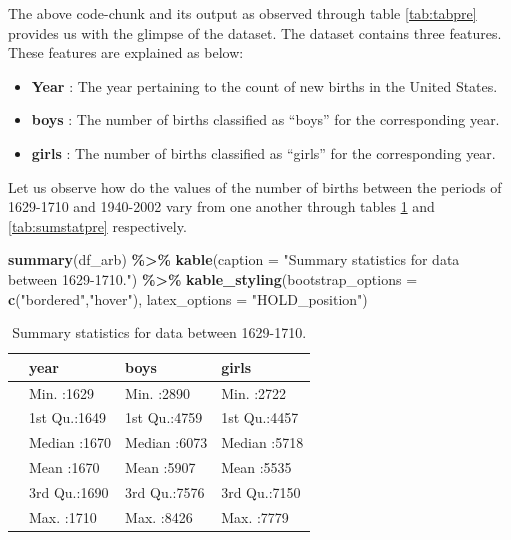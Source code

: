 \documentclass[11pt,a4paper,]{article}
\newenvironment{Shaded}{\begin{snugshade}}{\end{snugshade}}
\newcommand{\AttributeTok}[1]{\textcolor[rgb]{0.13,0.29,0.53}{#1}}
\newcommand{\FunctionTok}[1]{\textcolor[rgb]{0.13,0.29,0.53}{\textbf{#1}}}
\newcommand{\NormalTok}[1]{#1}
\newcommand{\SpecialCharTok}[1]{\textcolor[rgb]{0.81,0.36,0.00}{\textbf{#1}}}
\newcommand{\StringTok}[1]{\textcolor[rgb]{0.31,0.60,0.02}{#1}}
\providecommand{\tightlist}{%
  \setlength{\itemsep}{0pt}\setlength{\parskip}{0pt}}
\begin{document}
The above code-chunk and its output as observed through table \ref{tab:tabpre} provides us with the glimpse of the dataset. The dataset contains three features. These features are explained as below:

\begin{itemize}
\tightlist
\item
  \textbf{Year} : The year pertaining to the count of new births in the United States.
\item
  \textbf{boys} : The number of births classified as ``boys'' for the corresponding year.
\item
  \textbf{girls} : The number of births classified as ``girls'' for the corresponding year.
\end{itemize}

Let us observe how do the values of the number of births between the periods of 1629-1710 and 1940-2002 vary from one another through tables \ref{tab:sumstatarb} and \ref{tab:sumstatpre} respectively.

\scriptsize

\begin{Shaded}
\begin{Highlighting}[]
\FunctionTok{summary}\NormalTok{(df\_arb) }\SpecialCharTok{\%\textgreater{}\%} \FunctionTok{kable}\NormalTok{(}\AttributeTok{caption =} \StringTok{"Summary statistics for data between 1629{-}1710."}\NormalTok{) }\SpecialCharTok{\%\textgreater{}\%} 
  \FunctionTok{kable\_styling}\NormalTok{(}\AttributeTok{bootstrap\_options =} \FunctionTok{c}\NormalTok{(}\StringTok{"bordered"}\NormalTok{,}\StringTok{"hover"}\NormalTok{),}
                                    \AttributeTok{latex\_options =} \StringTok{"HOLD\_position"}\NormalTok{) }
\end{Highlighting}
\end{Shaded}

\begin{table}[H]

\caption{\label{tab:sumstatarb}Summary statistics for data between 1629-1710.}
\centering
\begin{tabular}[t]{l|l|l|l}
\hline
  &      year &      boys &     girls\\
\hline
 & Min.   :1629 & Min.   :2890 & Min.   :2722\\
\hline
 & 1st Qu.:1649 & 1st Qu.:4759 & 1st Qu.:4457\\
\hline
 & Median :1670 & Median :6073 & Median :5718\\
\hline
 & Mean   :1670 & Mean   :5907 & Mean   :5535\\
\hline
 & 3rd Qu.:1690 & 3rd Qu.:7576 & 3rd Qu.:7150\\
\hline
 & Max.   :1710 & Max.   :8426 & Max.   :7779\\
\hline
\end{tabular}
\end{table}
\end{document}
